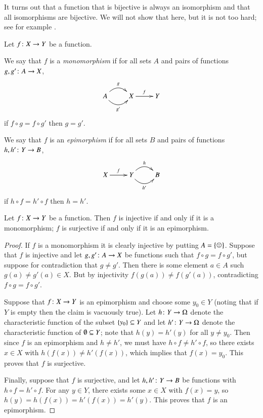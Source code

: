 \begin{remark}

It turns out that a function that is bijective is always an isomorphism and that all isomorphisms are bijective. We will not show that here, but it is not too hard; see for example \cite[Theorem 5.4]{Big}.

\end{remark}

\begin{definition}\label{def:mono, epi in set}

Let $f\taking X\to Y$ be a function. 

We say that $f$ is a {\em monomorphism} if for all sets $A$ and pairs of functions $g,g'\taking A\to X$,
$$
\xymatrix{A\ar@/^1pc/[r]^g\ar@/_1pc/[r]_{g'}&X\ar[r]^f&Y}
$$
if $f\circ g=f\circ g'$ then $g=g'$.

We say that $f$ is an {\em epimorphism} if for all sets $B$ and pairs of functions $h,h'\taking Y\to B$, 
$$
\xymatrix{X\ar[r]^f&Y\ar@/^1pc/[r]^h\ar@/_1pc/[r]_{h'}&B}
$$
if $h\circ f=h'\circ f$ then $h=h'$.

\end{definition}

\begin{proposition}\label{prop:inj and surj}

Let $f\taking X\to Y$ be a function. Then $f$ is injective if and only if it is a monomorphism; $f$ is surjective if and only if it is an epimorphism.

\end{proposition}

\begin{proof}

If $f$ is a monomorphism it is clearly injective by putting $A=\singleton$. Suppose that $f$ is injective and let $g,g'\taking A\to X$ be functions such that $f\circ g=f\circ g'$, but suppose for contradiction that $g\neq g'$. Then there is some element $a\in A$ such $g(a)\neq g'(a)\in X$. But by injectivity $f(g(a))\neq f(g'(a))$, contradicting $f\circ g=f\circ g'$.

Suppose that $f\taking X\to Y$ is an epimorphism and choose some $y_0\in Y$ (noting that if $Y$ is empty then the claim is vacuously true). Let $h\taking Y\to\Omega$ denote the characteristic function of the subset $\{y_0\}\ss Y$ and let $h'\taking Y\to\Omega$ denote the characteristic function of $\emptyset\ss Y$; note that $h(y)=h'(y)$ for all $y\neq y_0$. Then since $f$ is an epimorphism and $h\neq h'$, we must have $h\circ f\neq h'\circ f$, so there exists $x\in X$ with $h(f(x))\neq h'(f(x))$, which implies that $f(x)=y_0$. This proves that $f$ is surjective.

Finally, suppose that $f$ is surjective, and let $h,h'\taking Y\to B$ be functions with $h\circ f=h'\circ f$. For any $y\in Y$, there exists some $x\in X$ with $f(x)=y$, so $h(y)=h(f(x))=h'(f(x))=h'(y)$. This proves that $f$ is an epimorphism.

\end{proof}

